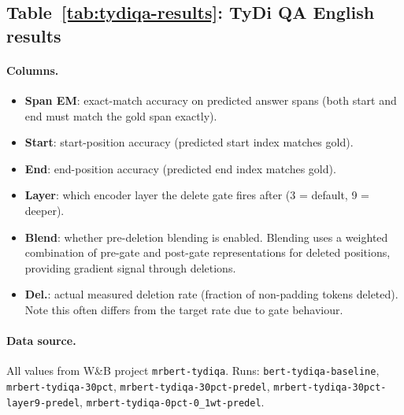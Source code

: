 \documentclass{article} %
\begin{document}
\subsection{Table~\ref{tab:tydiqa-results}: TyDi QA English results}

\paragraph{Columns.}
\begin{itemize}[nosep]
    \item \textbf{Span EM}: exact-match accuracy on predicted answer spans (both start and end must match the gold span exactly).
    \item \textbf{Start}: start-position accuracy (predicted start index matches gold).
    \item \textbf{End}: end-position accuracy (predicted end index matches gold).
    \item \textbf{Layer}: which encoder layer the delete gate fires after (3 = default, 9 = deeper).
    \item \textbf{Blend}: whether pre-deletion blending is enabled. Blending uses a weighted combination of pre-gate and post-gate representations for deleted positions, providing gradient signal through deletions.
    \item \textbf{Del.}: actual measured deletion rate (fraction of non-padding tokens deleted). Note this often differs from the target rate due to gate behaviour.
\end{itemize}

\paragraph{Data source.}
All values from W\&B project \texttt{mrbert-tydiqa}. Runs: \texttt{bert-tydiqa-baseline}, \texttt{mrbert-tydiqa-30pct}, \texttt{mrbert-tydiqa-30pct-predel}, \texttt{mrbert-tydiqa-30pct-layer9-predel}, \texttt{mrbert-tydiqa-0pct-0\_1wt-predel}.
\end{document}
